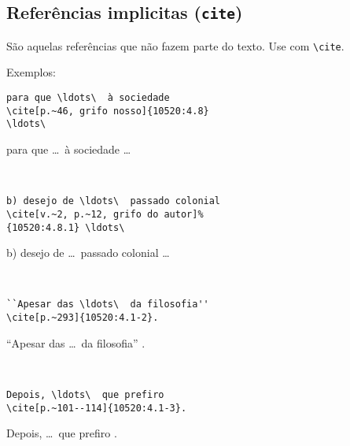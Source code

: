 \documentclass[espacosimples]{abnt}
\newcommand{\VerbL}{0.54\textwidth}
\newcommand{\LatL}{0.45\textwidth}
\begin{document}
\subsection{Referências implicitas ({\tt cite})}

São aquelas referências que não fazem parte do texto. Use com \verb+\cite+.

Exemplos:

\vspace{5mm}
\noindent\begin{minipage}[t]{\VerbL}\small\begin{verbatim}
para que \ldots\  à sociedade
\cite[p.~46, grifo nosso]{10520:4.8}  
\ldots\
\end{verbatim}\end{minipage}\begin{minipage}[t]{\LatL}\small
para que \ldots\ à sociedade 
\cite[p.~46, grifo nosso]{10520:4.8}
\ldots\
\end{minipage}\vspace{5mm}\\

\noindent\begin{minipage}[t]{\VerbL}\small\begin{verbatim}
b) desejo de \ldots\  passado colonial
\cite[v.~2, p.~12, grifo do autor]%
{10520:4.8.1} \ldots\
\end{verbatim}\end{minipage}\begin{minipage}[t]{\LatL}\small
b) desejo de \ldots\  passado colonial
\cite[v.~2, p.~12, grifo do autor]%
{10520:4.8.1} \ldots\
\end{minipage}\vspace{5mm}\\

\noindent\begin{minipage}[t]{\VerbL}\small\begin{verbatim}
``Apesar das \ldots\  da filosofia''
\cite[p.~293]{10520:4.1-2}.
\end{verbatim}\end{minipage}\begin{minipage}[t]{\LatL}\small
``Apesar das \ldots\ da filosofia'' \cite[p.~293]{10520:4.1-2}.
\end{minipage}\vspace{5mm}\\

\noindent\begin{minipage}[t]{\VerbL}\small\begin{verbatim}
Depois, \ldots\  que prefiro
\cite[p.~101--114]{10520:4.1-3}.
\end{verbatim}\end{minipage}\begin{minipage}[t]{\LatL}\small
Depois, \ldots\ que prefiro \cite[p.~101--114]{10520:4.1-3}.
\end{minipage}\vspace{5mm}\\
\end{document}
